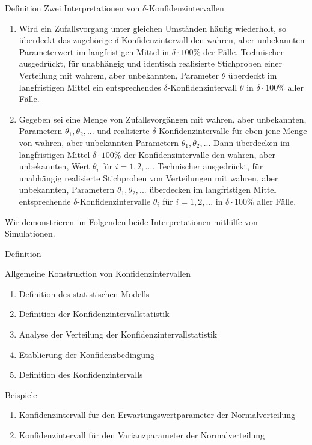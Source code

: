 \documentclass[
  8pt,
  ignorenonframetext,
]{beamer}
\providecommand{\tightlist}{%
  \setlength{\itemsep}{0pt}\setlength{\parskip}{0pt}}
\begin{document}
\begin{frame}{Definition}
\protect\hypertarget{definition-1}{}
Zwei Interpretationen von \(\delta\)-Konfidenzintervallen

\small

\begin{enumerate}
[(1)]
\item
  \justifying  Wird ein Zufallsvorgang unter gleichen Umständen häufig
  wiederholt, so überdeckt das zugehörige \(\delta\)-Konfidenzintervall
  den wahren, aber unbekannten Parameterwert im langfristigen Mittel in
  \(\delta\cdot 100 \%\) der Fälle. Technischer ausgedrückt, für
  unabhängig und identisch realisierte Stichproben einer Verteilung mit
  wahrem, aber unbekannten, Parameter \(\theta\) überdeckt im
  langfristigen Mittel ein entsprechendes \(\delta\)-Konfidenzintervall
  \(\theta\) in \(\delta\cdot 100 \%\) aller Fälle.
\item
  Gegeben sei eine Menge von Zufallsvorgängen mit wahren, aber
  unbekannten, Parametern \(\theta_1,\theta_2,...\) und realisierte
  \(\delta\)-Konfidenzintervalle für eben jene Menge von wahren, aber
  unbekannten Parametern \(\theta_1,\theta_2,...\) Dann überdecken im
  langfristigen Mittel \(\delta\cdot 100 \%\) der Konfidenzintervalle
  den wahren, aber unbekannten, Wert \(\theta_i\) für \(i = 1,2,...\).
  Technischer ausgedrückt, für unabhängig realisierte Stichproben von
  Verteilungen mit wahren, aber unbekannten, Parametern
  \(\theta_1, \theta_2,...\) überdecken im langfristigen Mittel
  entsprechende \(\delta\)-Konfidenzintervalle \(\theta_i\) für
  \(i = 1,2,...\) in \(\delta\cdot 100 \%\) aller Fälle.
\end{enumerate}

Wir demonstrieren im Folgenden beide Interpretationen mithilfe von
Simulationen.
\end{frame}

\begin{frame}{Definition}
\protect\hypertarget{definition-2}{}

Allgemeine Konstruktion von Konfidenzintervallen

\begin{enumerate}
[(1)]
\tightlist
\item
  Definition des statistischen Modells
\item
  Definition der Konfidenzintervallstatistik
\item
  Analyse der Verteilung der Konfidenzintervallstatistik
\item
  Etablierung der Konfidenzbedingung
\item
  Definition des Konfidenzintervalls
\end{enumerate}

\normalsize

Beispiele

\begin{enumerate}
[(1)]
\tightlist
\item
  Konfidenzintervall für den Erwartungswertparameter der
  Normalverteilung
\item
  Konfidenzintervall für den Varianzparameter der Normalverteilung
\end{enumerate}
\end{frame}
\end{document}
